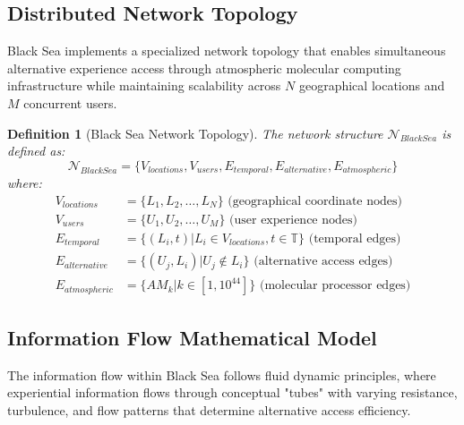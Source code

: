 \documentclass[12pt,a4paper]{article}
\newtheorem{definition}{Definition}
\begin{document}
\subsection{Distributed Network Topology}

Black Sea implements a specialized network topology that enables simultaneous alternative experience access through atmospheric molecular computing infrastructure while maintaining scalability across $N$ geographical locations and $M$ concurrent users.

\begin{definition}[Black Sea Network Topology]
The network structure $\mathcal{N}_{BlackSea}$ is defined as:
\begin{equation}
\mathcal{N}_{BlackSea} = \{V_{locations}, V_{users}, E_{temporal}, E_{alternative}, E_{atmospheric}\}
\end{equation}
where:
\begin{align}
V_{locations} &= \{L_1, L_2, \ldots, L_N\} \text{ (geographical coordinate nodes)} \\
V_{users} &= \{U_1, U_2, \ldots, U_M\} \text{ (user experience nodes)} \\
E_{temporal} &= \{(L_i, t) | L_i \in V_{locations}, t \in \mathbb{T}\} \text{ (temporal edges)} \\
E_{alternative} &= \{(U_j, L_i) | U_j \not\in L_i\} \text{ (alternative access edges)} \\
E_{atmospheric} &= \{AM_k | k \in [1, 10^{44}]\} \text{ (molecular processor edges)}
\end{align}
\end{definition}

\subsection{Information Flow Mathematical Model}

The information flow within Black Sea follows fluid dynamic principles, where experiential information flows through conceptual "tubes" with varying resistance, turbulence, and flow patterns that determine alternative access efficiency.
\end{document}
